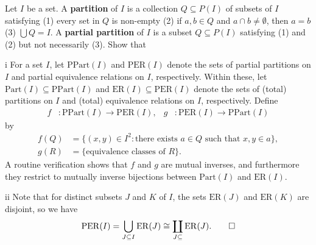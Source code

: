 \begin{exercise}
Let \(I\) be a set.
A \textbf{partition} of \(I\) is a collection \(Q \subseteq P(I)\) of subsets of \(I\) satisfying (1) every set in \(Q\) is non-empty (2) if \(a, b \in Q\) and \(a \cap b \neq \emptyset\), then \(a = b\) (3) \(\bigcup Q = I\).
A \textbf{partial partition} of \(I\) is a subset \(Q \subseteq P(I)\) satisfying (1) and (2) but not necessarily (3).
Show that
\end{exercise}

\begin{partsolution}{i}
For a set \(I\), let \(\mathrm{PPart}(I)\) and \(\mathrm{PER}(I)\) denote the sets of partial partitions on \(I\) and partial equivalence relations on \(I\), respectively.
Within these, let \(\mathrm{Part}(I) \subseteq \mathrm{PPart}(I)\) and \(\mathrm{ER}(I) \subseteq \mathrm{PER}(I)\) denote the sets of (total) partitions on \(I\) and (total) equivalence relations on \(I\), respectively.
Define
\begin{align*}
f &: \mathrm{PPart}(I) \to \mathrm{PER}(I), &
g &: \mathrm{PER}(I) \to \mathrm{PPart}(I)
\end{align*}
by
\begin{align*}
f(Q) &= \big\{(x, y) \in I^2 : \text{there exists \(a \in Q\) such that \(x, y \in a\)}\big\}, \\
g(R) &= \big\{\text{equivalence classes of \(R\)}\big\}.
\end{align*}
A routine verification shows that \(f\) and \(g\) are mutual inverses, and furthermore they restrict to mutually inverse bijections between \(\mathrm{Part}(I)\) and \(\mathrm{ER}(I)\).
\end{partsolution}

\begin{partsolution}{ii}
Note that for distinct subsets \(J\) and \(K\) of \(I\), the sets \(\mathrm{ER}(J)\) and \(\mathrm{ER}(K)\) are disjoint, so we have
\begin{equation*}
\mathrm{PER}(I)
= \bigcup_{J \subseteq I} \mathrm{ER}(J)
\cong \coprod_{J \subseteq} \mathrm{ER}(J).
\qedhere
\end{equation*}
\end{partsolution}